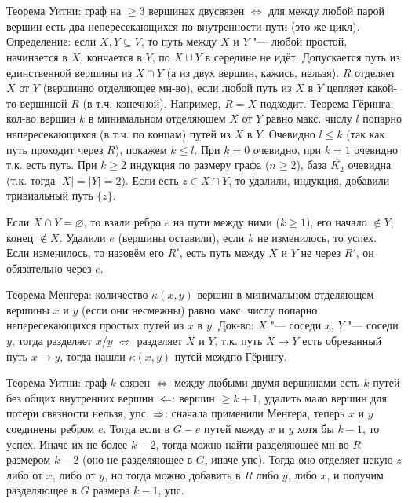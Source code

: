 \section{} %
	Теорема Уитни: граф на $\ge 3$ вершинах двусвязен $\iff$ для между любой парой вершин
	есть два непересекающихся по внутренности пути (это же цикл).
	Определение: если $X, Y \subseteq V$, то путь между $X$ и $Y$ "--- любой простой,
	начинается в $X$, кончается в $Y$, по $X \cup Y$ в середине не идёт.
	Допускается путь из единственной вершины из $X \cap Y$ (\TODO а из двух вершин, кажись, нельзя).
	$R$ отделяет $X$ от $Y$ (вершинно отделяющее мн-во), если любой путь из $X$ в $Y$
	цепляет какой-то вершиной $R$ (в т.ч. конечной).
	Например, $R=X$ подходит.
	Теорема Гёринга: кол-во вершин $k$ в минимальном отделяющем $X$ от $Y$ равно макс. числу $l$ попарно
	непересекающихся (в т.ч. по концам) путей из $X$ в $Y$.
	Очевидно $l \le k$ (так как путь проходит через $R$), покажем $k \le l$.
	При $k=0$ очевидно, при $k=1$ очевидно т.к. есть путь.
	При $k\ge 2$ индукция по размеру графа ($n \ge 2$), база $\overline{K_2}$ очевидна (т.к. тогда $|X|=|Y|=2$).
	Если есть $z\in X \cap Y$, то удалили, индукция, добавили тривиальный путь $\{z\}$.

	Если $X \cap Y =\varnothing$, то взяли ребро $e$ на пути между ними ($k \ge 1$), его начало $\notin Y$, конец $\notin X$.
	Удалили $e$ (вершины оставили), если $k$ не изменилось, то успех.
	Если изменилось, то назовём его $R'$, есть путь между $X$ и $Y$ не через $R'$, он обязательно через $e$.
	\TODO

	Теорема Менгера: количество $\kappa(x, y)$ вершин в минимальном отделяющем вершины $x$ и $y$ (если они несмежны)
	равно макс. числу попарно непересекающихся простых путей из $x$ в $y$.
	Док-во: $X$ "--- соседи $x$, $Y$ "--- соседи $y$, тогда разделяет $x$/$y$ $\iff$ разделяет $X$ и $Y$,
	т.к. путь $X \to Y$ есть обрезанный путь $x \to y$, тогда нашли $\kappa(x, y)$ путей междпо Гёрингу.

	Теорема Уитни: граф $k$-связен $\iff$ между любыми двумя вершинами есть $k$ путей без общих внутренних вершин.
	$\Leftarrow$: вершин $\ge k+1$, удалить мало вершин для потери связности нельзя, упс.
	$\Rightarrow$: сначала применили Менгера, теперь $x$ и $y$ соединены ребром $e$.
	Тогда если в $G-e$ путей между $x$ и $y$ хотя бы $k-1$, то успех.
	Иначе их не более $k-2$, тогда можно найти разделяющее мн-во $R$ размером $k-2$ (оно не разделяющее в $G$, иначе упс).
	Тогда оно отделяет некую $z$ либо от $x$, либо от $y$, но тогда можно добавить в $R$ либо $y$, либо $x$, и получим разделяющее в $G$ размера $k-1$, упс.
